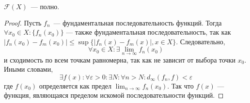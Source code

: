 \documentclass[11pt]{article}
\begin{document}
    \begin{lemma}
    $\mathcal{F}(X)$~--- полно.
    \begin{proof}
    Пусть $f_{n}$~--- фундаментальная последовательность функций. Тогда $\forall x_0 \in X: \{f_{n}(x_0)\}$ --- также фундаментальная последовательность, так как $|f_{n}(x_0) - f_{m}(x_0)| \leq \sup\{|f_{n}(x) - f_{m}(x)|, x \in X\}$. Следовательно,
    \begin{equation*}
        \forall x_0 \in X: \exists \lim_{n \to \infty} f_{n}(x_0)
    \end{equation*}
    и сходимость по всем точкам равномерна, так как не зависит от выбора точки $x_0$. Иными словами,
    \begin{equation*}
        \exists f(x): \forall \varepsilon > 0: \exists N: \forall n > N: d_{\infty}(f_n, f) < \varepsilon
    \end{equation*}
    где $f(x_0)$ определяется как предел $ \lim_{n \to \infty} f_{n}(x_0)$. Так что $f(x)$ --- функция, являющаяся пределом искомой последовательности функций.
    \end{proof}
    \end{lemma}
\end{document}
